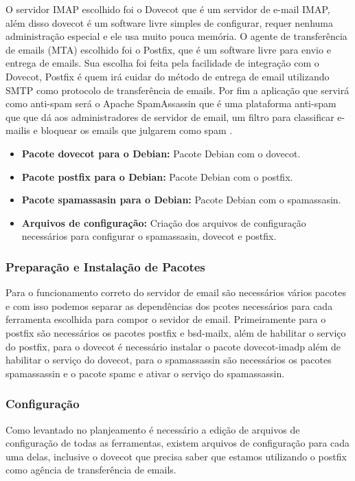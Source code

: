 O servidor IMAP escolhido foi o Dovecot que é um servidor de e-mail
IMAP, além disso dovecot é um software livre simples de configurar, requer nenhuma
administração especial e ele usa muito pouca memória\cite{dovecot}. O agente
de transferência de emails (MTA) escolhido foi o Postfix, que é um software
livre para envio e entrega de emails. Sua escolha foi feita pela facilidade de
integração com o Dovecot, Postfix é quem irá cuidar do método de entrega de email
utilizando SMTP como protocolo de transferência de emails. Por fim a aplicação
que servirá como anti-spam será o Apache SpamAssassin que é uma plataforma anti-spam
que que dá aos administradores de servidor de email, um filtro para classificar
 e-mailis e bloquear os emails que julgarem como spam \cite{spam}.

\begin{itemize}
   \item \textbf{Pacote dovecot para o Debian:} Pacote Debian com o dovecot.
   \item \textbf{Pacote postfix para o Debian:} Pacote Debian com o postfix.
   \item \textbf{Pacote spamassasin para o Debian:} Pacote Debian com o spamassasin.
   \item \textbf{Arquivos de configuração:} Criação dos arquivos de configuração
   necessários para configurar o spamassasin, dovecot e postfix.
\end{itemize}

\subsubsection{Preparação e Instalação de Pacotes }

Para o funcionamento correto do servidor de email são necessários vários pacotes
e com isso podemos separar as dependências dos pcotes necessários para cada ferramenta
escolhida para compor o sevidor de email. Primeiramente para o postfix são necessários
os pacotes postfix e bsd-mailx, além de habilitar o serviço do postfix, para o dovecot
é necessário instalar o pacote dovecot-imadp além de habilitar o serviço do dovecot,
para o spamassassin são necessários os pacotes spamassassin e o pacote spamc e ativar
o serviço do spamassassin.

\subsubsection{Configuração}

Como levantado no planjeamento é necessário a edição de arquivos de configuração
de todas as ferramentas, existem arquivos de configuração para cada uma delas, inclusive
o dovecot que precisa saber que estamos utilizando o postfix como agência de transferência
de emails.

